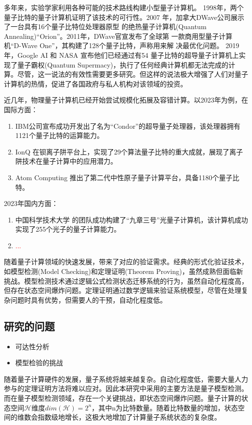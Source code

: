 多年来，实验学家利用各种可能的技术路线构建小型量子计算机。 1998年，两个量子比特的量子计算机证明了该技术的可行性\citep{chuang1998experimental}。2007
年，加拿大DWave公司展示了一台具有16个量子比特位处理器原型
的绝热量子计算机(Quantum Annealing)“Orion”。2011年，DWave官宣发布了全球第
一款商用型量子计算机“D-Wave One”，其构建了128个量子比特，声称用来解
决最优化问题。
2019 年，Google AI 和 NASA 宣布他们已经通过有54 量子比特的超导量子计算机上实现了量子霸权(Quantum Supermacy)，执行了任何经典计算机都无法完成的计算\citep{arute2019quantum}。尽管，这一说法的有效性需要更多研究\citep{pednault2019quantum}。但这样的说法极大增强了人们对量子计算机的热情，促进了各国政府与私人机构对该领域的投资。

近几年，物理量子计算机已经开始尝试规模化拓展及容错计算。以2023年为例，在国际方面：
\begin{enumerate}
    \item IBM公司宣布成功开发出了名为“Condor”的超导量子处理器，该处理器拥有1121个量子比特的运算能力。
    \item IonQ 在钡离子阱平台上，实现了29个算法量子比特的重大成就，展现了离子阱技术在量子计算中的应用潜力。
    \item Atom Computing 推出了第二代中性原子量子计算平台，具备1180个量子比特。
\end{enumerate}
2023年国内方面：
\begin{enumerate}
    \item 中国科学技术大学 的团队成功构建了“九章三号”光量子计算机，该计算机成功实现了255个光子的量子计算能力。
    \item \textcolor{red}{...}
\end{enumerate}

随着量子计算领域的快速发展，带来了对应的验证需求。经典的形式化验证技术，如模型检测(Model Checking)和定理证明(Theorem Proving)，虽然成熟但面临新挑战。模型检测技术通过逻辑公式检测状态迁移系统的行为，虽然自动化程度高，但存在状态空间爆炸问题。定理证明通过数学逻辑来验证系统模型，尽管在处理复杂问题时具有优势，但需要人的干预，自动化程度低。
\subsection{研究的问题}
\begin{itemize}
  \item 可达性分析
  \item 模型检验的挑战
\end{itemize}
随着量子计算硬件的发展，量子系统将越来越复杂。自动化程度低，需要大量人力参与的定理证明方法将难以应对。因此本研究中采用的主要方法是量子模型检测。
而在量子模型检测领域，存在一个关键挑战，即状态空间爆炸问题。量子计算的状态空间\(\mathcal{H}\)维度\(dim\left(\mathcal{H}\right)=2^n\)，其中n为比特数量。随着比特数量的增加，状态空间的维数会指数级地增长，这极大地增加了计算量子系统状态的复杂度。

